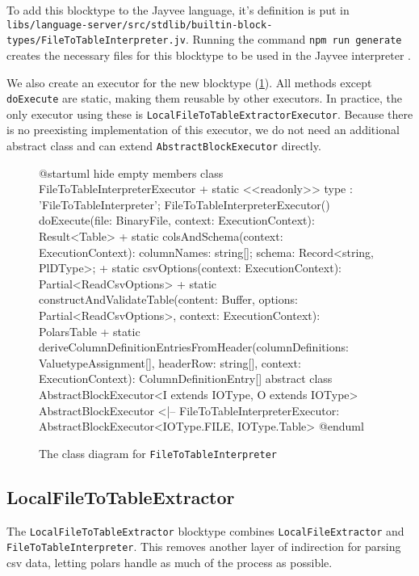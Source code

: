 To add this blocktype to the Jayvee language, it's definition is put in \Verb|libs/language-server/src/stdlib/builtin-block-types/FileToTableInterpreter.jv|.
Running the command \Verb|npm run generate| creates the necessary files for this blocktype to be used in the Jayvee interpreter \autocite{jvalue:jayvee:docs:stdlib}.

We also create an executor for the new blocktype (\ref {fig:uml:filetotableinterpreter}).
All methods except \Verb|doExecute| are static, making them reusable by other executors. In practice, the only executor using these is \Verb|LocalFileToTableExtractorExecutor|.
Because there is no preexisting implementation of this executor, we do not need an additional abstract class and can extend \Verb|AbstractBlockExecutor| directly.

\begin{figure}
	\begin{plantuml}
		@startuml
		hide empty members
		class FileToTableInterpreterExecutor {
		+ {static} <<readonly>> type : 'FileToTableInterpreter';
		FileToTableInterpreterExecutor()
		doExecute(file: BinaryFile, context: ExecutionContext): Result<Table>
		+ {static} colsAndSchema(context: ExecutionContext): { columnNames: string[]; schema: Record<string, PlDType>;}
		+ {static} csvOptions(context: ExecutionContext): Partial<ReadCsvOptions>
		+ {static} constructAndValidateTable(content: Buffer, options: Partial<ReadCsvOptions>, context: ExecutionContext): PolarsTable
		+ {static} deriveColumnDefinitionEntriesFromHeader(columnDefinitions: ValuetypeAssignment[], headerRow: string[], context: ExecutionContext): ColumnDefinitionEntry[]
		}
		abstract class AbstractBlockExecutor<I extends IOType, O extends IOType>
		AbstractBlockExecutor <|-- FileToTableInterpreterExecutor: AbstractBlockExecutor<IOType.FILE, IOType.Table>
		@enduml
	\end{plantuml}
	\caption{The class diagram for \Verb|FileToTableInterpreter|}
	\label{fig:uml:filetotableinterpreter}
\end{figure}

\subsection{LocalFileToTableExtractor}
The \Verb|LocalFileToTableExtractor| blocktype combines \Verb|LocalFileExtractor| and \Verb|FileToTableInterpreter|.
This removes another layer of indirection for parsing csv data, letting polars handle as much of the process as possible.

